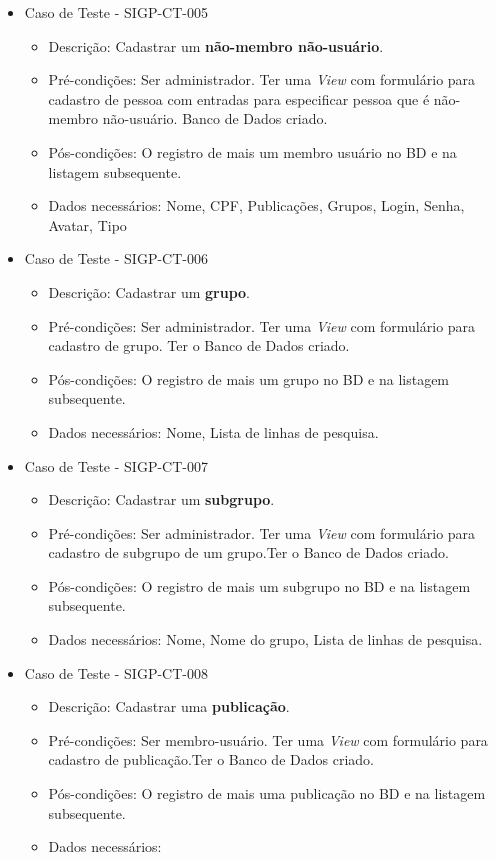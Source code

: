 \documentclass[11pt, a4paper]{book}
\begin{document}
\begin{itemize}
	\item Caso de Teste - SIGP-CT-005
	\begin{itemize}
	\item Descrição: Cadastrar um \textbf{não-membro não-usuário}.
	\item Pré-condições: Ser administrador. Ter uma \emph{View} com formulário para cadastro de pessoa com entradas para especificar pessoa que é não-membro não-usuário. Banco de Dados criado.
	\item Pós-condições: O registro de mais um membro usuário no BD e na listagem subsequente.
	\item Dados necessários:  Nome, CPF, Publicações, Grupos, Login, Senha, Avatar, Tipo
	\end{itemize}

	\item Caso de Teste - SIGP-CT-006
	\begin{itemize}
	\item Descrição: Cadastrar um \textbf{grupo}.
	\item Pré-condições: Ser administrador. Ter uma \emph{View} com formulário para cadastro de grupo. Ter o Banco de Dados criado.
	\item Pós-condições: O registro de mais um grupo no BD e na listagem subsequente.
	\item Dados necessários: Nome, Lista de linhas de pesquisa.
	\end{itemize}

	\item Caso de Teste - SIGP-CT-007
	\begin{itemize}
	\item Descrição: Cadastrar um \textbf{subgrupo}.
	\item Pré-condições: Ser administrador. Ter uma \emph{View} com formulário para cadastro de subgrupo de um grupo.Ter o Banco de Dados criado.
	\item Pós-condições: O registro de mais um subgrupo no BD e na listagem subsequente.
	\item Dados necessários: Nome, Nome do grupo, Lista de linhas de pesquisa.
	\end{itemize}

	\item Caso de Teste - SIGP-CT-008
	\begin{itemize}
	\item Descrição: Cadastrar uma \textbf{publicação}.
	\item Pré-condições: Ser membro-usuário. Ter uma \emph{View} com formulário para cadastro de publicação.Ter o Banco de Dados criado.
	\item Pós-condições: O registro de mais uma publicação no BD e na listagem subsequente.
	\item Dados necessários: 
	\end{itemize}


\end{itemize}
\end{document}
